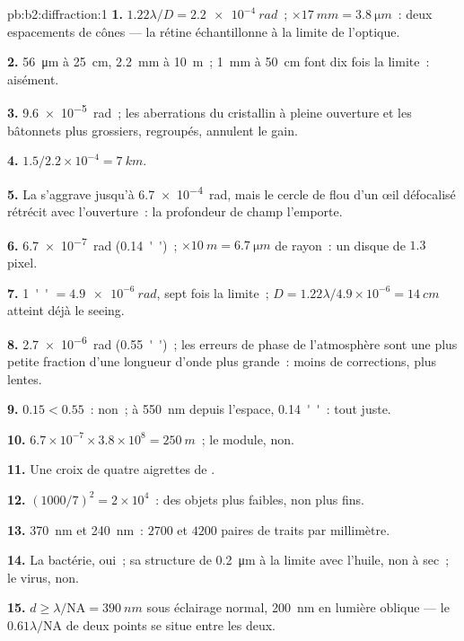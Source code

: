 \begin{solution}{pb:b2:diffraction:1}
\textbf{1.} $1.22\lambda/D = \qty{2.2e-4}{rad}$~; $\times\qty{17}{mm} = \qty{3.8}{\micro m}$~: deux espacements
de cônes --- la rétine échantillonne à la limite de l'optique.

\textbf{2.} \qty{56}{\micro m} à \qty{25}{cm}, \qty{2.2}{mm} à \qty{10}{m}~; \qty{1}{mm} à
\qty{50}{cm} font dix fois la limite~: aisément.

\textbf{3.} \qty{9.6e-5}{rad}~; les aberrations du cristallin à pleine ouverture et les
bâtonnets plus grossiers, regroupés, annulent le gain.

\textbf{4.} $1.5/2.2 \times 10^{-4} = \qty{7}{km}$.

\textbf{5.} La  s'aggrave jusqu'à \qty{6.7e-4}{rad}, mais le cercle de flou
d'un œil défocalisé rétrécit avec l'ouverture~: la profondeur de champ l'emporte.

\textbf{6.} \qty{6.7e-7}{rad} (\qty{0.14}{''})~; $\times\qty{10}{m} = \qty{6.7}{\micro m}$ de rayon~: un
disque de $1.3$ pixel.

\textbf{7.} \qty{1}{''} $= \qty{4.9e-6}{rad}$, sept fois la limite~; $D = 1.22\lambda/4.9
\times 10^{-6} = \qty{14}{cm}$ atteint déjà le seeing.

\textbf{8.} \qty{2.7e-6}{rad} (\qty{0.55}{''})~; les erreurs de phase de l'atmosphère sont
une plus petite fraction d'une longueur d'onde plus grande~: moins de corrections, plus lentes.

\textbf{9.} $0.15 < 0.55$~: non~; à \qty{550}{nm} depuis l'espace, \qty{0.14}{''}~: tout juste.

\textbf{10.} $6.7 \times 10^{-7} \times 3.8 \times 10^8 = \qty{250}{m}$~; le module, non.

\textbf{11.} Une croix de quatre aigrettes de .

\textbf{12.} $(1000/7)^2 = 2 \times 10^4$~: des objets plus faibles, non plus fins.

\textbf{13.} \qty{370}{nm} et \qty{240}{nm}~: $2700$ et $4200$ paires de traits par
millimètre.

\textbf{14.} La bactérie, oui~; sa structure de \qty{0.2}{\micro m} à la limite
avec l'huile, non à sec~; le virus, non.

\textbf{15.} $d \ge \lambda/\mathrm{NA} = \qty{390}{nm}$ sous éclairage normal, \qty{200}{nm}
en lumière oblique --- le $0.61\lambda/\mathrm{NA}$ de deux points se situe entre les deux.


\end{solution}
